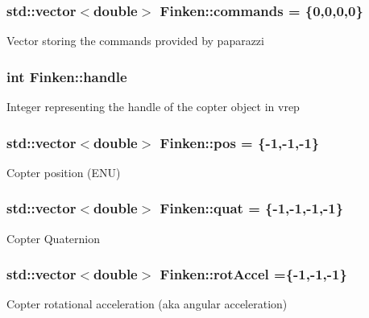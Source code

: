 \subsubsection[{\texorpdfstring{commands}{commands}}]{\setlength{\rightskip}{0pt plus 5cm}std\+::vector$<$double$>$ Finken\+::commands = \{0,0,0,0\}}\hypertarget{classFinken_aa4fe546d88b52ff92990bd67ced70567}{}\label{classFinken_aa4fe546d88b52ff92990bd67ced70567}
Vector storing the commands provided by paparazzi 
\subsubsection[{\texorpdfstring{handle}{handle}}]{\setlength{\rightskip}{0pt plus 5cm}int Finken\+::handle}\hypertarget{classFinken_a96990553bc26c8bf26effe8edd6e6369}{}\label{classFinken_a96990553bc26c8bf26effe8edd6e6369}
Integer representing the handle of the copter object in vrep 
\subsubsection[{\texorpdfstring{pos}{pos}}]{\setlength{\rightskip}{0pt plus 5cm}std\+::vector$<$double$>$ Finken\+::pos = \{-\/1,-\/1,-\/1\}}\hypertarget{classFinken_a726c0ea1d756fe0837a3f042665d8d4a}{}\label{classFinken_a726c0ea1d756fe0837a3f042665d8d4a}
Copter position (E\+NU) 
\subsubsection[{\texorpdfstring{quat}{quat}}]{\setlength{\rightskip}{0pt plus 5cm}std\+::vector$<$double$>$ Finken\+::quat = \{-\/1,-\/1,-\/1,-\/1\}}\hypertarget{classFinken_a3968cbe3b6f76678367ecb61f044a221}{}\label{classFinken_a3968cbe3b6f76678367ecb61f044a221}
Copter Quaternion 
\subsubsection[{\texorpdfstring{rot\+Accel}{rotAccel}}]{\setlength{\rightskip}{0pt plus 5cm}std\+::vector$<$double$>$ Finken\+::rot\+Accel =\{-\/1,-\/1,-\/1\}}\hypertarget{classFinken_ab1b738a1b691879be240b1b9488f7009}{}\label{classFinken_ab1b738a1b691879be240b1b9488f7009}
Copter rotational acceleration (aka angular acceleration) 
